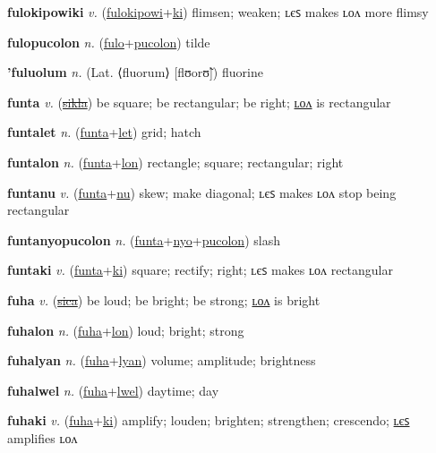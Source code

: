 \textbf{\hypertarget{fulokipowiki}{fulokipowiki}} \textit{v.} (\hyperlink{fulokipowi}{fulokipowi}+\allowbreak \hyperlink{ki}{ki})
flimsen; weaken; ʟєꜱ makes ʟᴏᴧ more flimsy

\textbf{\hypertarget{fulopucolon}{fulopucolon}} \textit{n.} (\hyperlink{fulo}{fulo}+\allowbreak \hyperlink{pucolon}{pucolon})
tilde

\textbf{\hypertarget{'fuluolum}{'fuluolum}} \textit{n.} (Lat. ⟨fluorum⟩ [flʊorʊ̃])
fluorine

\textbf{\hypertarget{funta}{funta}} \textit{v.} (\hyperlink{sikla}{\sout{sikla}})
be square; be rectangular; be right; \hyperlink{funtalon}{ʟᴏᴧ} is rectangular

\textbf{\hypertarget{funtalet}{funtalet}} \textit{n.} (\hyperlink{funta}{funta}+\allowbreak \hyperlink{let}{let})
grid; hatch

\textbf{\hypertarget{funtalon}{funtalon}} \textit{n.} (\hyperlink{funta}{funta}+\allowbreak \hyperlink{lon}{lon})
rectangle; square; rectangular; right

\textbf{\hypertarget{funtanu}{funtanu}} \textit{v.} (\hyperlink{funta}{funta}+\allowbreak \hyperlink{nu}{nu})
skew; make diagonal; ʟєꜱ makes ʟᴏᴧ stop being rectangular

\textbf{\hypertarget{funtanyopucolon}{funtanyopucolon}} \textit{n.} (\hyperlink{funta}{funta}+\allowbreak \hyperlink{nyo}{nyo}+\allowbreak \hyperlink{pucolon}{pucolon})
slash

\textbf{\hypertarget{funtaki}{funtaki}} \textit{v.} (\hyperlink{funta}{funta}+\allowbreak \hyperlink{ki}{ki})
square; rectify; right; ʟєꜱ makes ʟᴏᴧ rectangular

\textbf{\hypertarget{fuha}{fuha}} \textit{v.} (\hyperlink{sica}{\sout{sica}})
be loud; be bright; be strong; \hyperlink{fuhalon}{ʟᴏᴧ} is bright

\textbf{\hypertarget{fuhalon}{fuhalon}} \textit{n.} (\hyperlink{fuha}{fuha}+\allowbreak \hyperlink{lon}{lon})
loud; bright; strong

\textbf{\hypertarget{fuhalyan}{fuhalyan}} \textit{n.} (\hyperlink{fuha}{fuha}+\allowbreak \hyperlink{lyan}{lyan})
volume; amplitude; brightness

\textbf{\hypertarget{fuhalwel}{fuhalwel}} \textit{n.} (\hyperlink{fuha}{fuha}+\allowbreak \hyperlink{lwel}{lwel})
daytime; day

\textbf{\hypertarget{fuhaki}{fuhaki}} \textit{v.} (\hyperlink{fuha}{fuha}+\allowbreak \hyperlink{ki}{ki})
amplify; louden; brighten; strengthen; crescendo; \hyperlink{fuhakiles}{ʟєꜱ} amplifies ʟᴏᴧ

